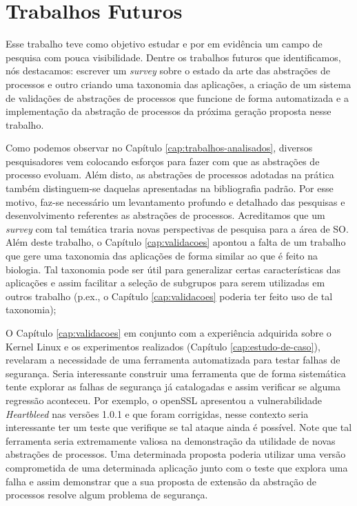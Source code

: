 \section{Trabalhos Futuros}


Esse trabalho teve como objetivo estudar e por em evidência um campo de
pesquisa com pouca visibilidade. Dentre os trabalhos futuros que identificamos,
nós destacamos: escrever um \textit{survey} sobre o estado da arte das
abstrações de processos e outro criando uma taxonomia das aplicações, a criação
de um sistema de validações de abstrações de processos que funcione de forma
automatizada e a implementação da abstração de processos da próxima geração
proposta nesse trabalho.

Como podemos observar no Capítulo \ref{cap:trabalhos-analisados}, diversos
pesquisadores vem colocando esforços para fazer com que as abstrações de
processo evoluam. Além disto, as abstrações de processos adotadas na prática
também distinguem-se daquelas apresentadas na bibliografia padrão. Por esse
motivo, faz-se necessário um levantamento profundo e detalhado das pesquisas e
desenvolvimento referentes as abstrações de processos. Acreditamos que um
\textit{survey} com tal temática traria novas perspectivas de pesquisa para a
área de SO. Além deste trabalho, o Capítulo \ref{cap:validacoes} apontou a
falta de um trabalho que gere uma taxonomia das aplicações de forma similar ao
que é feito na biologia.  Tal taxonomia pode ser útil para generalizar certas
características das aplicações e assim facilitar a seleção de subgrupos para
serem utilizadas em outros trabalho (p.ex., o Capítulo \ref{cap:validacoes}
poderia ter feito uso de tal taxonomia);

O Capítulo \ref{cap:validacoes} em conjunto com a experiência adquirida sobre o
Kernel Linux e os experimentos realizados (Capítulo \ref{cap:estudo-de-caso}),
revelaram a necessidade de uma ferramenta automatizada para testar falhas de
segurança. Seria interessante construir uma ferramenta que de forma sistemática
tente explorar as falhas de segurança já catalogadas e assim verificar se
alguma regressão aconteceu. Por exemplo, o openSSL apresentou a vulnerabilidade
\textit{Heartbleed} nas versões 1.0.1 e que foram corrigidas, nesse contexto
seria interessante ter um teste que verifique se tal ataque ainda é possível.
Note que tal ferramenta seria extremamente valiosa na demonstração da utilidade
de novas abstrações de processos. Uma determinada proposta poderia utilizar uma
versão comprometida de uma determinada aplicação junto com o teste que explora
uma falha e assim demonstrar que a sua proposta de extensão da abstração de
processos resolve algum problema de segurança.


